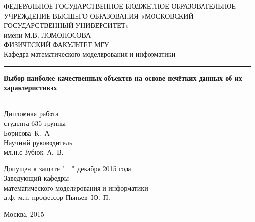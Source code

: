 
\begin{titlepage}

\begin{center}
\vfill

ФЕДЕРАЛЬНОЕ ГОСУДАРСТВЕННОЕ БЮДЖЕТНОЕ ОБРАЗОВАТЕЛЬНОЕ 
УЧРЕЖДЕНИЕ ВЫСШЕГО ОБРАЗОВАНИЯ 
«МОСКОВСКИЙ ГОСУДАРСТВЕННЫЙ УНИВЕРСИТЕТ» \\
имени М.В. ЛОМОНОСОВА
\ \\[1ex]
ФИЗИЧЕСКИЙ ФАКУЛЬТЕТ МГУ
\ \\[0.8ex]
Кафедра математического моделирования и информатики
\ \\[1.8ex] 
\hrule 

\vfill

{\large\bf Выбор наиболее качественных объектов на основе нечётких данных об их характеристиках \\}
\ \\[2ex]
\begin{flushright}
\begin{minipage}{0.35\textwidth}
Дипломная работа  \\ студента 635 группы \\ Борисова~К.~А
\\[1ex]
Научный руководитель \\ мл.н.с Зубюк~А.~В.
\end{minipage}
\end{flushright}

\vfill
\end{center}
\hspace{3em}\begin{minipage}{0.65\textwidth}
Допущен к защите "\ \  "\  декабря 2015 года.
\\[1ex]
Заведующий кафедры \\
математического моделирования и информатики \\ 
д.ф.-м.н. профессор Пытьев~Ю.~П.
\end{minipage}

\vfill
\begin{center}
Москва, 2015
\end{center}

\end{titlepage}